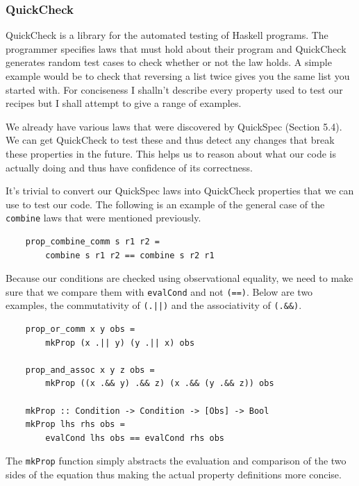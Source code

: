 \documentclass[11pt]{article}
\begin{document}
\subsubsection{QuickCheck}

QuickCheck \cite{quickcheck} is a library for the automated testing of Haskell
programs. The programmer specifies laws that must hold about their program
and QuickCheck generates random test cases to check whether or not the
law holds. A simple example would be to check that reversing a list
twice gives you the same list you started with. For conciseness I shalln't
describe every property used to test our recipes but I shall attempt
to give a range of examples.

\medbreak

We already have various laws that were discovered by QuickSpec
(Section 5.4). We can get QuickCheck to test these and thus detect any changes
that break these properties in the future. This helps us to reason about what our code
is actually doing and thus have confidence of its correctness.

\medbreak

It's trivial to convert our QuickSpec laws into QuickCheck properties that
we can use to test our code. The following is an example of the general
case of the \texttt{combine} laws that were mentioned previously.

\begin{lstlisting}
    prop_combine_comm s r1 r2 =
        combine s r1 r2 == combine s r2 r1
\end{lstlisting}

Because our conditions are checked using observational equality, we need
to make sure that we compare them with \texttt{evalCond} and not \texttt{(==)}.
Below are two examples, the commutativity of \texttt{(.||)} and the associativity
of \texttt{(.\&\&)}.

\begin{lstlisting}
    prop_or_comm x y obs =
        mkProp (x .|| y) (y .|| x) obs

    prop_and_assoc x y z obs =
        mkProp ((x .&& y) .&& z) (x .&& (y .&& z)) obs

    mkProp :: Condition -> Condition -> [Obs] -> Bool
    mkProp lhs rhs obs =
        evalCond lhs obs == evalCond rhs obs
\end{lstlisting}

The \texttt{mkProp} function simply abstracts the evaluation and comparison of the two
sides of the equation thus making the actual property definitions more concise.
\end{document}
